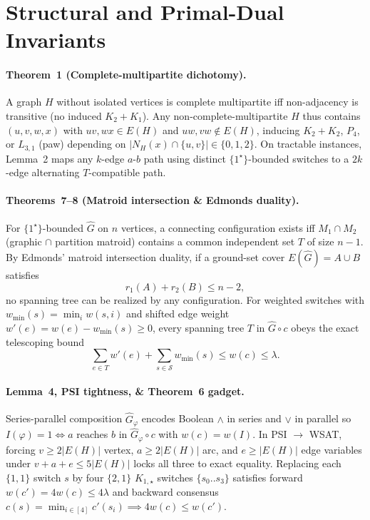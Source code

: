 \documentclass[11pt,twocolumn]{article}
\begin{document}
\section{Structural and Primal-Dual Invariants}\label{sec:prelim}
\paragraph{Theorem~1 (Complete-multipartite dichotomy).}
A graph $H$ without isolated vertices is complete multipartite iff non-adjacency is transitive (no induced $K_2{+}K_1$). Any non-complete-multipartite $H$ thus contains $(u,v,w,x)$ with $uv, wx \in E(H)$ and $uw, vw \notin E(H)$, inducing $K_2{+}K_2$, $P_4$, or $L_{3,1}$ (paw) depending on $|N_H(x) \cap \{u,v\}| \in \{0,1,2\}$. On tractable instances, Lemma~2 maps any $k$-edge $a$-$b$ path using distinct $\{1^\star\}$-bounded switches to a $2k$-edge alternating $T$-compatible path.

\paragraph{Theorems~7--8 (Matroid intersection \& Edmonds duality).}
For $\{1^\star\}$-bounded $\hat{G}$ on $n$ vertices, a connecting configuration exists iff $M_1 \cap M_2$ (graphic $\cap$ partition matroid) contains a common independent set $T$ of size $n-1$. By Edmonds' matroid intersection duality, if a ground-set cover $E(\hat{G}) = A \cup B$ satisfies
\begin{equation}
  r_1(A) + r_2(B) \le n - 2,
  \label{eq:edmonds}
\end{equation}
no spanning tree can be realized by any configuration. For weighted switches with $w_{\min}(s) = \min_i w(s,i)$ and shifted edge weight $w'(e) = w(e) - w_{\min}(s) \ge 0$, every spanning tree $T$ in $\hat{G}\circ c$ obeys the exact telescoping bound
\begin{equation}
  \sum_{e \in T} w'(e) + \sum_{s \in \mathcal{S}} w_{\min}(s) \le w(c) \le \lambda.
  \label{eq:shifted}
\end{equation}

\paragraph{Lemma~4, PSI tightness, \& Theorem~6 gadget.}
Series-parallel composition $\hat{G}_\varphi$ encodes Boolean $\land$ in series and $\lor$ in parallel so $I(\varphi)=1 \iff a$ reaches $b$ in $\hat{G}_\varphi \circ c$ with $w(c)=w(I)$. In PSI $\to$ WSAT, forcing $v \ge 2|E(H)|$ vertex, $a \ge 2|E(H)|$ arc, and $e \ge |E(H)|$ edge variables under $v+a+e \le 5|E(H)|$ locks all three to exact equality. Replacing each $\{1,1\}$ switch $s$ by four $\{2,1\}$ $K_{1,\star}$ switches $\{s_0..s_3\}$ satisfies forward $w(c') = 4w(c) \le 4\lambda$ and backward consensus $c(s) = \min_{i\in[4]} c'(s_i) \implies 4w(c) \le w(c')$.
\end{document}
